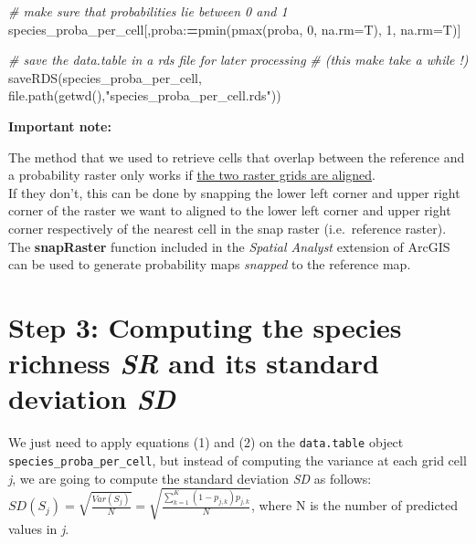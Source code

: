 \documentclass[
]{article}
\newenvironment{Shaded}{\begin{snugshade}}{\end{snugshade}}
\newcommand{\AttributeTok}[1]{\textcolor[rgb]{0.77,0.63,0.00}{#1}}
\newcommand{\CommentTok}[1]{\textcolor[rgb]{0.56,0.35,0.01}{\textit{#1}}}
\newcommand{\DecValTok}[1]{\textcolor[rgb]{0.00,0.00,0.81}{#1}}
\newcommand{\ErrorTok}[1]{\textcolor[rgb]{0.64,0.00,0.00}{\textbf{#1}}}
\newcommand{\FunctionTok}[1]{\textcolor[rgb]{0.00,0.00,0.00}{#1}}
\newcommand{\NormalTok}[1]{#1}
\newcommand{\SpecialCharTok}[1]{\textcolor[rgb]{0.00,0.00,0.00}{#1}}
\newcommand{\StringTok}[1]{\textcolor[rgb]{0.31,0.60,0.02}{#1}}
\begin{document}
\begin{Shaded}
\begin{Highlighting}[]
\CommentTok{\# make sure that probabilities lie between 0 and 1}
\NormalTok{species\_proba\_per\_cell[,proba}\SpecialCharTok{:}\ErrorTok{=}\FunctionTok{pmin}\NormalTok{(}\FunctionTok{pmax}\NormalTok{(proba, }\DecValTok{0}\NormalTok{, }\AttributeTok{na.rm=}\NormalTok{T), }\DecValTok{1}\NormalTok{, }\AttributeTok{na.rm=}\NormalTok{T)]}

\CommentTok{\# save the data.table in a rds file for later processing}
\CommentTok{\# (this make take a while !)}
\FunctionTok{saveRDS}\NormalTok{(species\_proba\_per\_cell, }\FunctionTok{file.path}\NormalTok{(}\FunctionTok{getwd}\NormalTok{(),}\StringTok{"species\_proba\_per\_cell.rds"}\NormalTok{))}
\end{Highlighting}
\end{Shaded}

\begin{warningbox}
\textbf{Important note:}

The method that we used to retrieve cells that overlap between the
reference and a probability raster only works if
\underline{the two raster grids are aligned}.\\
If they don't, this can be done by snapping the lower left corner and
upper right corner of the raster we want to aligned to the lower left
corner and upper right corner respectively of the nearest cell in the
snap raster (i.e.~reference raster).\\
The \textbf{snapRaster} function included in the \emph{Spatial Analyst}
extension of ArcGIS can be used to generate probability maps
\emph{snapped} to the reference map.

\end{warningbox}

\hypertarget{step-3-computing-the-species-richness-sr-and-its-standard-deviation-sd}{%
\section{\texorpdfstring{Step 3: Computing the species richness
\emph{SR} and its standard deviation
\emph{SD}}{Step 3: Computing the species richness SR and its standard deviation SD}}\label{step-3-computing-the-species-richness-sr-and-its-standard-deviation-sd}}

We just need to apply equations (1) and (2) on the \texttt{data.table}
object \texttt{species\_proba\_per\_cell}, but instead of computing the
variance at each grid cell \emph{j}, we are going to compute the
standard deviation \emph{SD} as follows:
\(SD(S_j)=\sqrt{\frac{Var(S_j)}{N}}=\sqrt{\frac{\sum_{k=1}^K(1-p_{j,k})p_{j,k}}{N}}\),
where N is the number of predicted values in \emph{j}.
\end{document}
